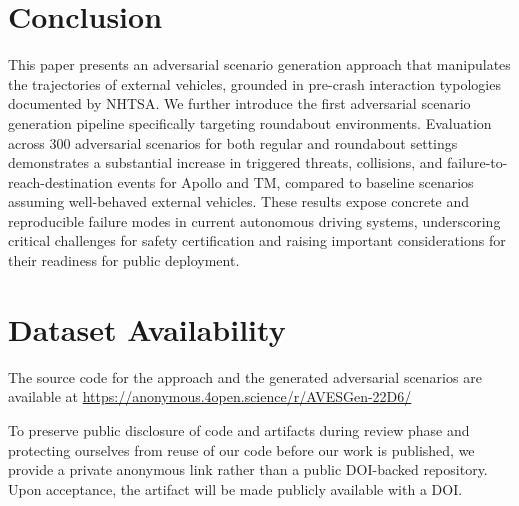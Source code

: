 \documentclass[sigconf,review,anonymous]{acmart}
\begin{document}




\section{Conclusion}
This paper presents an adversarial scenario generation approach that manipulates the trajectories of external vehicles, grounded in pre-crash interaction typologies documented by NHTSA. We further introduce the first adversarial scenario generation pipeline specifically targeting roundabout environments.
Evaluation across 300 adversarial scenarios for both regular and roundabout settings demonstrates a substantial increase in triggered threats, collisions, and failure-to-reach-destination events for Apollo and TM, compared to baseline scenarios assuming well-behaved external vehicles.
These results expose concrete and reproducible failure modes in current autonomous driving systems, underscoring critical challenges for safety certification and raising important considerations for their readiness for public deployment.
\section{Dataset Availability}
The source code for the approach and the generated adversarial scenarios are available at
\url{https://anonymous.4open.science/r/AVESGen-22D6/}

\noindent To preserve public disclosure of code and artifacts during review phase and protecting ourselves from reuse of our code before our work is published, we provide a private anonymous link rather than a public DOI-backed repository. Upon acceptance, the artifact will be made publicly available with a DOI.

\newpage


\end{document}
